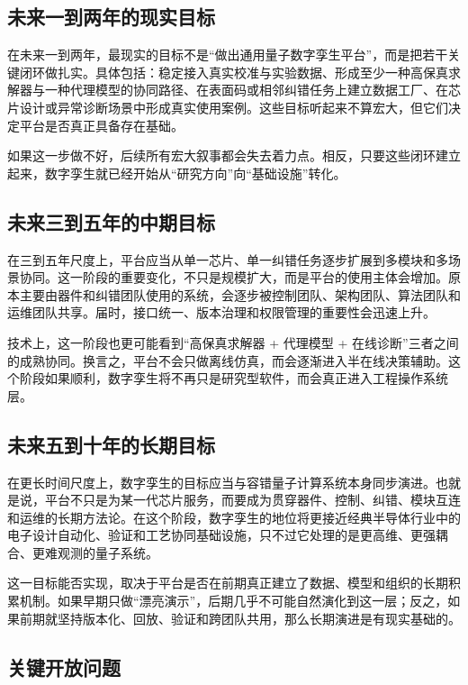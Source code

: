 \documentclass[11pt,a4paper]{article}
\begin{document}
\subsection{未来一到两年的现实目标}

在未来一到两年，最现实的目标不是“做出通用量子数字孪生平台”，而是把若干关键闭环做扎实。具体包括：稳定接入真实校准与实验数据、形成至少一种高保真求解器与一种代理模型的协同路径、在表面码或相邻纠错任务上建立数据工厂、在芯片设计或异常诊断场景中形成真实使用案例。这些目标听起来不算宏大，但它们决定平台是否真正具备存在基础。

如果这一步做不好，后续所有宏大叙事都会失去着力点。相反，只要这些闭环建立起来，数字孪生就已经开始从“研究方向”向“基础设施”转化。

\subsection{未来三到五年的中期目标}

在三到五年尺度上，平台应当从单一芯片、单一纠错任务逐步扩展到多模块和多场景协同。这一阶段的重要变化，不只是规模扩大，而是平台的使用主体会增加。原本主要由器件和纠错团队使用的系统，会逐步被控制团队、架构团队、算法团队和运维团队共享。届时，接口统一、版本治理和权限管理的重要性会迅速上升。

技术上，这一阶段也更可能看到“高保真求解器 + 代理模型 + 在线诊断”三者之间的成熟协同。换言之，平台不会只做离线仿真，而会逐渐进入半在线决策辅助。这个阶段如果顺利，数字孪生将不再只是研究型软件，而会真正进入工程操作系统层。

\subsection{未来五到十年的长期目标}

在更长时间尺度上，数字孪生的目标应当与容错量子计算系统本身同步演进。也就是说，平台不只是为某一代芯片服务，而要成为贯穿器件、控制、纠错、模块互连和运维的长期方法论。在这个阶段，数字孪生的地位将更接近经典半导体行业中的电子设计自动化、验证和工艺协同基础设施，只不过它处理的是更高维、更强耦合、更难观测的量子系统。

这一目标能否实现，取决于平台是否在前期真正建立了数据、模型和组织的长期积累机制。如果早期只做“漂亮演示”，后期几乎不可能自然演化到这一层；反之，如果前期就坚持版本化、回放、验证和跨团队共用，那么长期演进是有现实基础的。

\subsection{关键开放问题}
\end{document}
